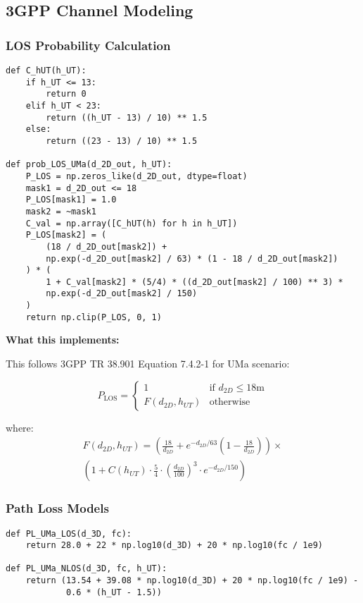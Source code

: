 \documentclass[11pt,a4paper]{article}
\begin{document}
\subsection{3GPP Channel Modeling}

\subsubsection{LOS Probability Calculation}

\begin{lstlisting}[caption={3GPP LOS Probability Model}]
def C_hUT(h_UT):
    if h_UT <= 13:
        return 0
    elif h_UT < 23:
        return ((h_UT - 13) / 10) ** 1.5
    else:
        return ((23 - 13) / 10) ** 1.5

def prob_LOS_UMa(d_2D_out, h_UT):
    P_LOS = np.zeros_like(d_2D_out, dtype=float)
    mask1 = d_2D_out <= 18
    P_LOS[mask1] = 1.0
    mask2 = ~mask1
    C_val = np.array([C_hUT(h) for h in h_UT])
    P_LOS[mask2] = (
        (18 / d_2D_out[mask2]) +
        np.exp(-d_2D_out[mask2] / 63) * (1 - 18 / d_2D_out[mask2])
    ) * (
        1 + C_val[mask2] * (5/4) * ((d_2D_out[mask2] / 100) ** 3) *
        np.exp(-d_2D_out[mask2] / 150)
    )
    return np.clip(P_LOS, 0, 1)
\end{lstlisting}

\textbf{What this implements:}

This follows 3GPP TR 38.901 Equation 7.4.2-1 for UMa scenario:

\begin{equation}
P_{\text{LOS}} = \begin{cases}
1 & \text{if } d_{2D} \leq 18\text{m} \\
F(d_{2D}, h_{UT}) & \text{otherwise}
\end{cases}
\end{equation}

where:
\begin{multline}
F(d_{2D}, h_{UT}) = \left(\frac{18}{d_{2D}} + e^{-d_{2D}/63}\left(1-\frac{18}{d_{2D}}\right)\right) \times \\
\left(1 + C(h_{UT}) \cdot \frac{5}{4} \cdot \left(\frac{d_{2D}}{100}\right)^3 \cdot e^{-d_{2D}/150}\right)
\end{multline}

\subsubsection{Path Loss Models}

\begin{lstlisting}[caption={3GPP Path Loss Implementation}]
def PL_UMa_LOS(d_3D, fc):
    return 28.0 + 22 * np.log10(d_3D) + 20 * np.log10(fc / 1e9)

def PL_UMa_NLOS(d_3D, fc, h_UT):
    return (13.54 + 39.08 * np.log10(d_3D) + 20 * np.log10(fc / 1e9) - 
            0.6 * (h_UT - 1.5))
\end{lstlisting}
\end{document}
